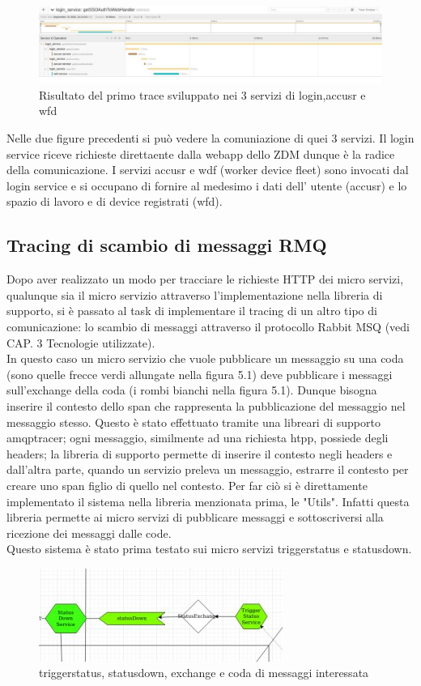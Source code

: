 \documentclass[a4paper,12pt,titlepage,italian,openany]{report}
\begin{document}
\begin{figure}[H]
    \includegraphics[scale = 0.4]{43.jpg}
    \centering
    \caption{Risultato del primo trace sviluppato nei 3 servizi di login,accusr e wfd}
\end{figure}
Nelle due figure precedenti si può vedere la comuniazione di quei 3 servizi. Il login service riceve richieste direttaente dalla webapp dello ZDM\cite{zdm:1} dunque è la radice della comunicazione. I servizi accusr e wdf (worker device fleet) sono invocati dal login service e si occupano di fornire al medesimo i dati dell' utente (accusr) e lo spazio di lavoro e di device registrati (wfd).
\subsection{Tracing di scambio di messaggi RMQ}
Dopo aver realizzato un modo per tracciare le richieste HTTP dei micro servizi, qualunque sia il micro servizio attraverso l'implementazione nella libreria di supporto, si è passato al task di implementare
il tracing di un altro tipo di comunicazione: lo scambio di messaggi attraverso il protocollo Rabbit MSQ (vedi CAP. 3 Tecnologie utilizzate).\\
In questo caso un micro servizio che vuole pubblicare un messaggio su una coda (sono quelle frecce verdi allungate nella figura 5.1) deve pubblicare i messaggi sull'exchange della coda (i rombi bianchi nella figura 5.1). Dunque bisogna  inserire il contesto dello span che rappresenta la pubblicazione del messaggio nel messaggio stesso. Questo è stato effettuato tramite una libreari di supporto amqptracer; ogni messaggio, similmente ad una richiesta htpp, possiede degli headers; la libreria di supporto permette di inserire il contesto negli headers e dall'altra parte, quando un servizio preleva un messaggio, estrarre il contesto per creare uno span figlio di quello nel contesto.
Per far ciò si è direttamente implementato il sistema nella libreria menzionata prima, le "Utils". Infatti questa libreria permette ai micro servizi di pubblicare messaggi e sottoscriversi alla ricezione dei messaggi dalle code.\\
Questo sistema è stato prima testato sui micro servizi triggerstatus e statusdown.
\begin{figure}[H]
    \includegraphics[]{44.png}
    \centering
    \caption{triggerstatus, statusdown, exchange e coda di messaggi interessata}
\end{figure} 
\end{document}
